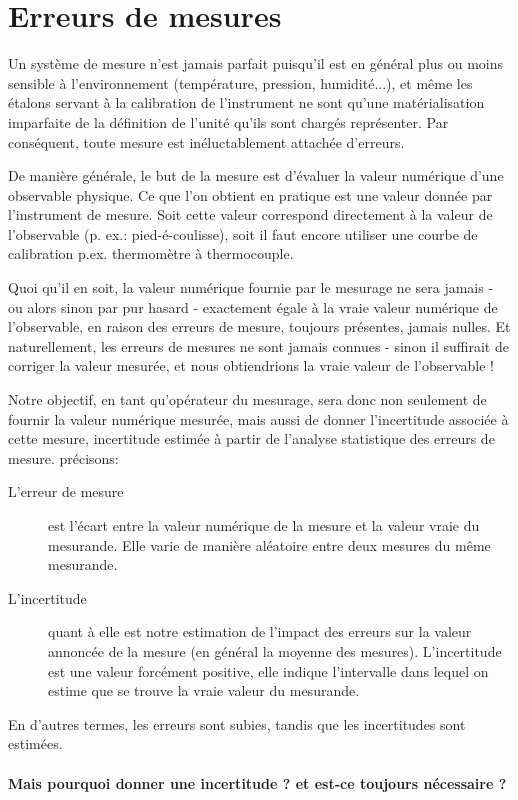 
\chapter{Erreurs de mesures}
Un système de mesure n'est jamais parfait puisqu'il est en général plus ou moins sensible à l'environnement (température, pression, humidité...), et même les étalons servant à la calibration de l'instrument ne sont qu'une matérialisation imparfaite de la définition de l'unité qu'ils sont chargés représenter. Par conséquent, toute mesure est inéluctablement attachée d'erreurs.

De manière générale, le but de la mesure est d'évaluer la valeur numérique d'une observable physique. Ce que l'on obtient en pratique est une valeur donnée par l'instrument de mesure. Soit cette valeur correspond directement à la valeur de l'observable (p. ex.: pied-é-coulisse), soit il faut encore utiliser une courbe de calibration p.ex. thermomètre à thermocouple.

Quoi qu'il en soit, la valeur numérique fournie par le mesurage ne sera jamais - ou alors sinon par pur hasard - exactement égale à la vraie valeur numérique de l'observable, en raison des erreurs de mesure, toujours présentes, jamais nulles. Et naturellement, les erreurs de mesures ne sont jamais connues - sinon il suffirait de corriger la valeur mesurée, et nous obtiendrions la vraie valeur de l'observable !

Notre objectif, en tant qu'opérateur du mesurage, sera donc non seulement de fournir la valeur numérique mesurée, mais aussi de donner l'incertitude associée à cette mesure, incertitude estimée à partir de l'analyse statistique des erreurs de mesure. précisons:

\begin{description}
\item[L'erreur de mesure] est l'écart entre la valeur numérique de la mesure et la valeur vraie du mesurande. Elle varie de manière aléatoire entre deux mesures du même mesurande.
\item[L'incertitude] quant à elle est notre estimation de l'impact des erreurs sur la valeur annoncée de la mesure (en général la moyenne des mesures). L'incertitude est une valeur forcément positive, elle indique l'intervalle dans lequel on estime que se trouve la vraie valeur du mesurande.
\end{description}
En d'autres termes, les erreurs sont subies, tandis que les incertitudes sont estimées.

\subsubsection*{Mais pourquoi donner une incertitude ? et est-ce toujours nécessaire ?}

